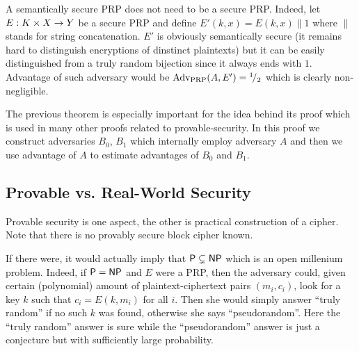 \begin{note}
	A semantically secure PRP does not need to be a secure PRP. Indeed, let $E: K\times X\rightarrow Y$ be a secure PRP and define $E'(k,x) = E(k,x)\|1$ where $\|$ stands for string concatenation. $E'$ is obviously semantically secure (it remains hard to distinguish encryptions of dinstinct plaintexts) but it can be easily distinguished from a truly random bijection since it always ends with $1$. Advantage of such adversary would be $\operatorname*{Adv_{PRP}}(A,E') = {}^{1}\!/_{2}$ which is clearly non-negligible.
\end{note}

The previous theorem is especially important for the idea behind its proof which is used in many other proofs related to provable-security. In this proof we construct adversaries $B_0$, $B_1$ which internally employ adversary $A$ and then we use advantage of $A$ to estimate advantages of $B_0$ and $B_1$.



\subsection{Provable vs. Real-World Security}
\label{sec:provable}

Provable security is one aspect, the other is practical construction of a cipher. Note that there is no provably secure block cipher known.

If there were, it would actually imply that $\mathsf{P} \subsetneq \mathsf{NP}$ which is an open millenium problem. Indeed, if $\mathsf{P} = \mathsf{NP}$ and $E$ were a PRP, then the adversary could, given certain (polynomial) amount of plaintext-ciphertext pairs $(m_i,c_i)$, look for a key $k$ such that $c_i = E(k,m_i)$ for all $i$. Then she would simply answer ``truly random'' if no such $k$ was found, otherwise she says ``pseudorandom''. Here the ``truly random'' answer is sure while the ``pseudorandom'' answer is just a conjecture but with sufficiently large probability.

